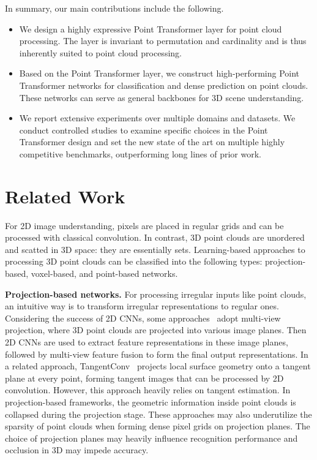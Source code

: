 \documentclass[final]{cvpr}
\newcommand\mypara[1]{\vspace{1mm}\noindent\textbf{#1}}
\begin{document}
In summary, our main contributions include the following.
\begin{itemize}[itemsep=1mm, topsep=1mm]
	\item
	We design a highly expressive Point Transformer layer for point cloud processing. The layer is invariant to permutation and cardinality and is thus inherently suited to point cloud processing.
	\item
	Based on the Point Transformer layer, we construct high-performing Point Transformer networks for classification and dense prediction on point clouds. These networks can serve as general backbones for 3D scene understanding.
	\item
	We report extensive experiments over multiple domains and datasets. We conduct controlled studies to examine specific choices in the Point Transformer design and set the new state of the art on multiple highly competitive benchmarks, outperforming long lines of prior work.
\end{itemize}
 
\section{Related Work}
\label{sec:related}
For 2D image understanding, pixels are placed in regular grids and can be processed with classical convolution. In contrast, 3D point clouds are unordered and scatted in 3D space: they are essentially sets. Learning-based approaches to processing 3D point clouds can be classified into the following types: projection-based, voxel-based, and point-based networks.

\mypara{Projection-based networks.}
For processing irregular inputs like point clouds, an intuitive way is to transform irregular representations to regular ones. Considering the success of 2D CNNs, some approaches~\cite{su15mvcnn,li2016vehicle,chen2017multi,kanezaki2018rotationnet,lang2019pointpillars} adopt multi-view projection, where 3D point clouds are projected into various image planes. Then 2D CNNs are used to extract feature representations in these image planes, followed by multi-view feature fusion to form the final output representations. In a related approach, TangentConv~\cite{tatarchenko2018tangent} projects local surface geometry onto a tangent plane at every point, forming tangent images that can be processed by 2D convolution. However, this approach heavily relies on tangent estimation. In projection-based frameworks, the geometric information inside point clouds is collapsed during the projection stage. These approaches may also underutilize the sparsity of point clouds when forming dense pixel  grids on projection planes. The choice of projection planes may heavily influence recognition performance and occlusion in 3D may impede accuracy.
\end{document}
